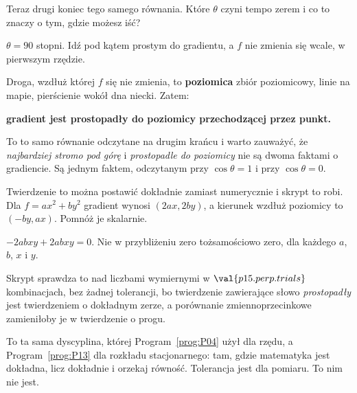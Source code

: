 \begin{fr}
Teraz drugi koniec tego samego równania. Które $\theta$ czyni tempo zerem i co
to znaczy o tym, gdzie możesz iść?
\dotline
\nextframe
\end{fr}

\begin{fr}
\begin{ansblock}
$\theta = 90$ stopni. Idź pod kątem prostym do gradientu, a $f$ nie zmienia
się wcale, w pierwszym rzędzie.
\end{ansblock}

Droga, wzdłuż której $f$ się nie zmienia, to \textbf{poziomica} \dash{} zbiór
poziomicowy, linie na mapie, pierścienie wokół dna niecki. Zatem:

\textbf{gradient jest prostopadły do poziomicy przechodzącej przez punkt.}

To to samo równanie odczytane na drugim krańcu i warto zauważyć, że
\emph{najbardziej stromo pod górę} i \emph{prostopadle do poziomicy} nie są
dwoma faktami o gradiencie. Są jednym faktem, odczytanym przy
$\cos\theta = 1$ i przy $\cos\theta = 0$.
\end{fr}

\begin{fr}
Twierdzenie to można postawić dokładnie zamiast numerycznie i skrypt to robi.
Dla $f = ax^{2} + by^{2}$ gradient wynosi $(2ax, 2by)$, a kierunek wzdłuż
poziomicy to $(-by, ax)$. Pomnóż je skalarnie.
\nextframe
\end{fr}

\begin{fr}
\begin{ansblock}
$-2abxy + 2abxy = 0$. Nie w przybliżeniu zero \dash{} tożsamościowo zero, dla
każdego $a$, $b$, $x$ i $y$.
\end{ansblock}

Skrypt sprawdza to nad liczbami wymiernymi w $\val{p15.perp.trials}$
kombinacjach, bez żadnej tolerancji, bo twierdzenie zawierające słowo
\emph{prostopadły} jest twierdzeniem o dokładnym zerze, a porównanie
zmiennoprzecinkowe zamieniłoby je w twierdzenie o progu.

\begin{note}
To ta sama dyscyplina, której Program~\ref{prog:P04} użył dla rzędu, a
Program~\ref{prog:P13} dla rozkładu stacjonarnego: tam, gdzie matematyka jest
dokładna, licz dokładnie i orzekaj równość. Tolerancja jest dla pomiaru. To
nim nie jest.
\end{note}
\end{fr}

